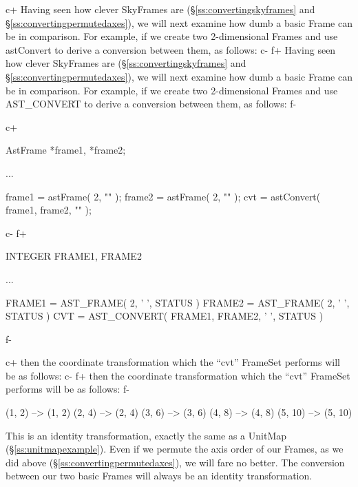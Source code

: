 \documentclass[twoside,11pt]{starlink}
\providecommand{\secref}[1]{\S\ref{#1}}
\begin{document}
c+
Having seen how clever SkyFrames are (\secref{ss:convertingskyframes}
and \secref{ss:convertingpermutedaxes}), we will next examine how dumb
a basic Frame can be in comparison. For example, if we create two
2-dimensional Frames and use astConvert to derive a conversion between
them, as follows:
c-
f+
Having seen how clever SkyFrames are (\secref{ss:convertingskyframes}
and \secref{ss:convertingpermutedaxes}), we will next examine how dumb
a basic Frame can be in comparison. For example, if we create two
2-dimensional Frames and use AST\_CONVERT to derive a conversion
between them, as follows:
f-

c+
\small
\begin{terminalv}
AstFrame *frame1, *frame2;

...

frame1 = astFrame( 2, "" );
frame2 = astFrame( 2, "" );
cvt = astConvert( frame1, frame2, "" );
\end{terminalv}
\normalsize
c-
f+
\small
\begin{terminalv}
      INTEGER FRAME1, FRAME2

      ...

      FRAME1 = AST_FRAME( 2, ' ', STATUS )
      FRAME2 = AST_FRAME( 2, ' ', STATUS )
      CVT = AST_CONVERT( FRAME1, FRAME2, ' ', STATUS )
\end{terminalv}
\normalsize
f-

c+
then the coordinate transformation which the ``cvt'' FrameSet performs
will be as follows:
c-
f+
then the coordinate transformation which the ``cvt'' FrameSet performs
will be as follows:
f-

\begin{terminalv}
(1, 2) --> (1, 2)
(2, 4) --> (2, 4)
(3, 6) --> (3, 6)
(4, 8) --> (4, 8)
(5, 10) --> (5, 10)
\end{terminalv}

This is an identity transformation, exactly the same as a UnitMap
(\secref{ss:unitmapexample}). Even if we permute the axis order of our
Frames, as we did above (\secref{ss:convertingpermutedaxes}), we will
fare no better. The conversion between our two basic Frames will
always be an identity transformation.
\end{document}

